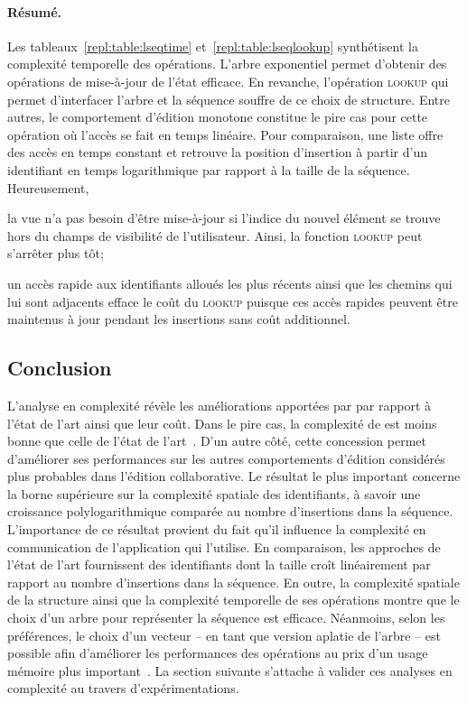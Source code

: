 \paragraph{Résumé.} Les tableaux~\ref{repl:table:lseqtime}
et~\ref{repl:table:lseqlookup} synthétisent la complexité temporelle des
opérations. L'arbre exponentiel permet d'obtenir des opérations de mise-à-jour
de l'état efficace. En revanche, l'opération \textsc{lookup} qui permet
d'interfacer l'arbre et la séquence souffre de ce choix de structure.  Entre
autres, le comportement d'édition monotone constitue le pire cas pour cette
opération où l'accès se fait en temps linéaire. Pour comparaison, une liste
offre des accès en temps constant et retrouve la position d'insertion à partir
d'un identifiant en temps logarithmique par rapport à la taille de la
séquence. Heureusement,
\begin{inparaenum}[(i)]
\item la vue n'a pas besoin d'être mise-à-jour si l'indice du nouvel élément se
  trouve hors du champs de visibilité de l'utilisateur. Ainsi, la fonction
  \textsc{lookup} peut s'arrêter plus tôt;
\item un accès rapide aux identifiants alloués les plus récents ainsi que les
  chemins qui lui sont adjacents efface le coût du \textsc{lookup} puisque ces
  accès rapides peuvent être maintenus à jour pendant les insertions sans coût
  additionnel.
\end{inparaenum}

\subsection{Conclusion}

L'analyse en complexité révèle les améliorations apportées par \LSEQ par rapport
à l'état de l'art ainsi que leur coût. Dans le pire cas, la complexité de \LSEQ
est moins bonne que celle de l'état de l'art~\cite{preguica2009commutative,
  weiss2009logoot}.  D'un autre côté, cette concession permet d'améliorer ses
performances sur les autres comportements d'édition considérés plus probables
dans l'édition collaborative. Le résultat le plus important concerne la borne
supérieure sur la complexité spatiale des identifiants, à savoir une croissance
polylogarithmique comparée au nombre d'insertions dans la séquence. L'importance
de ce résultat provient du fait qu'il influence la complexité en communication
de l'application qui l'utilise. En comparaison, les approches de l'état de
l'art fournissent des identifiants dont la taille croît linéairement par rapport
au nombre d'insertions dans la séquence.  En outre, la complexité spatiale de la
structure ainsi que la complexité temporelle de ses opérations montre que le
choix d'un arbre pour représenter la séquence est efficace. Néanmoins, selon les
préférences, le choix d'un vecteur -- en tant que version aplatie de l'arbre --
est possible afin d'améliorer les performances des opérations au prix d'un usage
mémoire plus important~\cite{weiss2009logoot}. La section suivante s'attache à
valider ces analyses en complexité au travers d'expérimentations.


